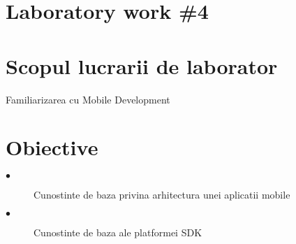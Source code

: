 \section*{Laboratory work \#4}

\section{Scopul lucrarii de laborator}
Familiarizarea cu Mobile Development

\section{Obiective}

\begin{description}
  \item[$\bullet$] Cunostinte de baza privina arhitectura unei aplicatii mobile
  \item[$\bullet$] Cunostinte de baza ale platformei SDK
\end{description}